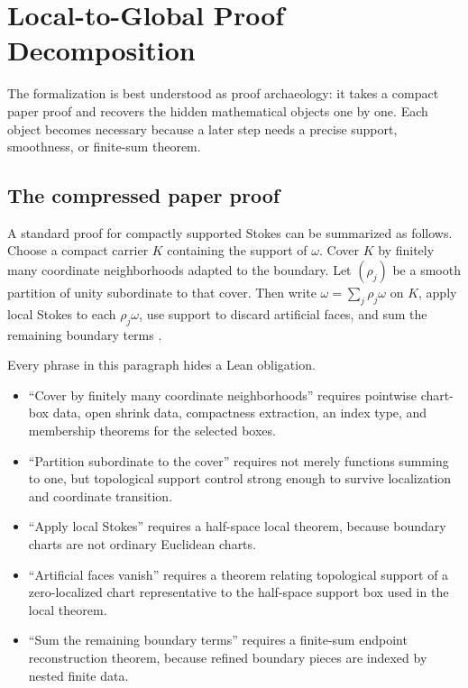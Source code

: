\section{Local-to-Global Proof Decomposition}
\label{sec:proof-decomposition}

The formalization is best understood as proof archaeology: it takes a compact
paper proof and recovers the hidden mathematical objects one by one.  Each
object becomes necessary because a later step needs a precise support,
smoothness, or finite-sum theorem.

\subsection{The compressed paper proof}

A standard proof for compactly supported Stokes can be summarized as follows.
Choose a compact carrier \(K\) containing the support of \(\omega\).  Cover
\(K\) by finitely many coordinate neighborhoods adapted to the boundary.  Let
\((\rho_j)\) be a smooth partition of unity subordinate to that cover.  Then
write \(\omega=\sum_j \rho_j\omega\) on \(K\), apply local Stokes to each
\(\rho_j\omega\), use support to discard artificial faces, and sum the
remaining boundary terms
\cite{spivak1965calculus,guillemin1974differential,warner1983foundations,lee2013smooth,morita2001geometry}.

Every phrase in this paragraph hides a Lean obligation.

\begin{itemize}
  \item ``Cover by finitely many coordinate neighborhoods'' requires pointwise
  chart-box data, open shrink data, compactness extraction, an index type, and
  membership theorems for the selected boxes.

  \item ``Partition subordinate to the cover'' requires not merely functions
  summing to one, but topological support control strong enough to survive
  localization and coordinate transition.

  \item ``Apply local Stokes'' requires a half-space local theorem, because
  boundary charts are not ordinary Euclidean charts.

  \item ``Artificial faces vanish'' requires a theorem relating topological
  support of a zero-localized chart representative to the half-space support
  box used in the local theorem.

  \item ``Sum the remaining boundary terms'' requires a finite-sum endpoint
  reconstruction theorem, because refined boundary pieces are indexed by
  nested finite data.
\end{itemize}


